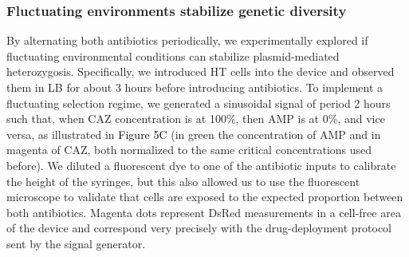 \documentclass[fleqn,12pt]{wlscirep}
\newcommand{\blue}[1]{\textcolor{black}{#1}}
\newcommand{\fig}[1]{\textcolor{black}{#1}}
\begin{document}
\subsubsection{Fluctuating environments stabilize genetic diversity}

By alternating both antibiotics periodically, we experimentally explored if fluctuating environmental conditions can stabilize plasmid-mediated heterozygosis.
Specifically, we introduced HT cells into the device and observed them in LB for about 3 hours before introducing antibiotics.
To implement a fluctuating selection regime, we generated a sinusoidal signal of period 2 hours such that, when CAZ concentration is at 100\%, then AMP is at 0\%, and vice versa, as illustrated in \fig{Figure 5C} (in green the concentration of AMP and in magenta of CAZ, both normalized to the same critical concentrations used before). 
We diluted a fluorescent dye to one of the antibiotic inputs to calibrate the height of the syringes, but this also allowed us to use the fluorescent microscope to validate that cells are exposed to the expected proportion between both antibiotics. Magenta dots represent DsRed measurements in a \blue{cell}-free area of the device and correspond very precisely with the drug-deployment protocol sent by the signal generator.
\end{document}
